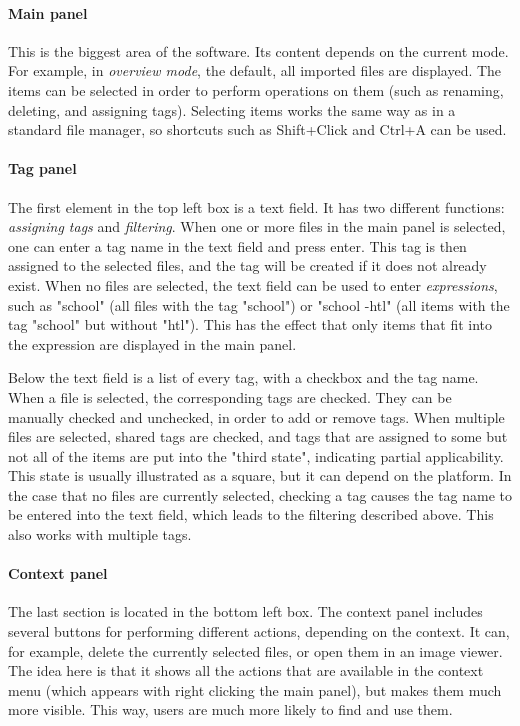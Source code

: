 \paragraph{Main panel} This is the biggest area of the software. Its content depends on the current mode. For example, in \textit{overview mode}, the default, all imported files are displayed. The items can be selected in order to perform operations on them (such as renaming, deleting, and assigning tags). Selecting items works the same way as in a standard file manager, so shortcuts such as Shift+Click and Ctrl+A can be used. %

\paragraph{Tag panel} The first element in the top left box is a text field. It has two different functions: \textit{assigning tags} and \textit{filtering}. When one or more files in the main panel is selected, one can enter a tag name in the text field and press enter. This tag is then assigned to the selected files, and the tag will be created if it does not already exist. When no files are selected, the text field can be used to enter \textit{expressions}, such as "school" (all files with the tag "school") or "school -htl" (all items with the tag "school" but without "htl"). This has the effect that only items that fit into the expression are displayed in the main panel.

Below the text field is a list of every tag, with a checkbox and the tag name. When a file is selected, the corresponding tags are checked. They can be manually checked and unchecked, in order to add or remove tags. When multiple files are selected, shared tags are checked, and tags that are assigned to some but not all of the items are put into the "third state", indicating partial applicability. This state is usually illustrated as a square, but it can depend on the platform. In the case that no files are currently selected, checking a tag causes the tag name to be entered into the text field, which leads to the filtering described above. This also works with multiple tags.

\paragraph{Context panel} The last section is located in the bottom left box. The context panel includes several buttons for performing different actions, depending on the context. It can, for example, delete the currently selected files, or open them in an image viewer. The idea here is that it shows all the actions that are available in the context menu (which appears with right clicking the main panel), but makes them much more visible. This way, users are much more likely to find and use them.

